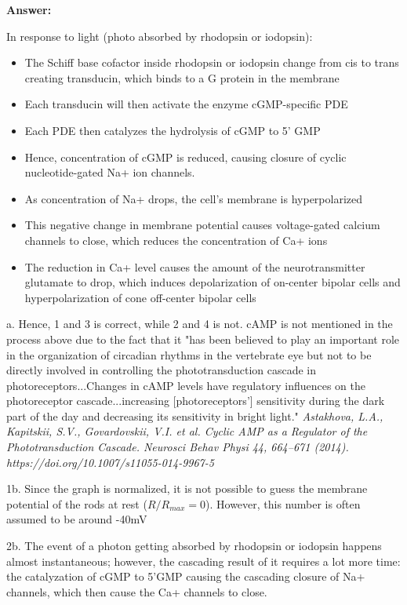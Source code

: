 \documentclass[letterpaper, 11pt]{article}
\begin{document}
\textbf{Answer:}

In response to light (photo absorbed by rhodopsin or iodopsin):
\begin{itemize}
	\item The Schiff base cofactor inside rhodopsin or iodopsin change from cis to trans creating transducin, which binds to a G protein in the membrane
	\item Each transducin will then activate the enzyme cGMP-specific PDE
	\item Each PDE then catalyzes the hydrolysis of cGMP to 5' GMP
	\item Hence, concentration of cGMP is reduced, causing closure of cyclic nucleotide-gated Na+ ion channels.
	\item As concentration of Na+ drops, the cell's membrane is hyperpolarized
	\item This negative change in membrane potential causes voltage-gated calcium channels to close, which reduces the concentration of Ca+ ions
	\item The reduction in Ca+ level causes the amount of the neurotransmitter glutamate to drop, which induces depolarization of on-center bipolar cells and hyperpolarization of cone off-center bipolar cells
\end{itemize}

a. Hence, 1 and 3 is correct, while 2 and 4 is not. cAMP is not mentioned in the process above due to the fact that it "has been believed to play an important role in the organization of circadian rhythms in the vertebrate eye but not to be directly involved in controlling the phototransduction cascade in photoreceptors...Changes in cAMP levels have regulatory influences on the photoreceptor cascade...increasing [photoreceptors'] sensitivity during the dark part of the day and decreasing its sensitivity in bright light." \textit{Astakhova, L.A., Kapitskii, S.V., Govardovskii, V.I. et al. Cyclic AMP as a Regulator of the Phototransduction Cascade. Neurosci Behav Physi 44, 664–671 (2014). https://doi.org/10.1007/s11055-014-9967-5}

1b. Since the graph is normalized, it is not possible to guess the membrane potential of the rods at rest ($R/R_{max} = 0$). However, this number is often assumed to be around -40mV

2b. The event of a photon getting absorbed by rhodopsin or iodopsin happens almost instantaneous; however, the cascading result of it requires a lot more time: the catalyzation of cGMP to 5'GMP causing the cascading closure of Na+ channels, which then cause the Ca+ channels to close.
\end{document}
